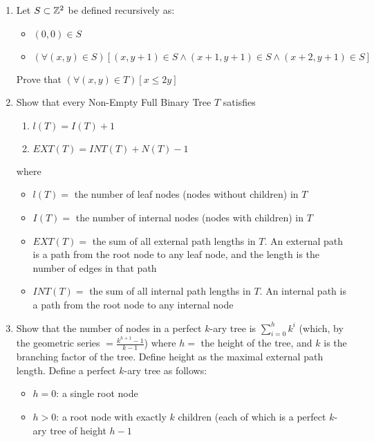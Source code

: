 \documentclass[main.tex]{subfiles}
\begin{document}
\begin{enumerate}
	\item Let \(S \subset \mathbb{Z}^2\) be defined recursively as:
	\begin{itemize}
		\item\((0,0) \in S\)
		\item \((\forall (x,y) \in S)[(x,y+1) \in S \land (x+1,y+1) \in S \land (x+2,y+1) \in S]\)
	\end{itemize}
	Prove that \((\forall (x,y) \in T)[x \leq 2y]\)
	\item Show that every Non-Empty Full Binary Tree \(T\) satisfies
	\begin{enumerate}
		\item \(l(T) = I(T) + 1\)
		\item \(EXT(T) = INT(T) + N(T) - 1\)
	\end{enumerate}
	where
	\begin{itemize}
		\item \(l(T) = \) the number of leaf nodes (nodes without children) in \(T\)
		\item \(I(T) = \) the number of internal nodes (nodes with children) in \(T\)
		\item \(EXT(T) = \) the sum of all external path lengths in \(T\). An external path is a path from the root node to any leaf node, and the length is the number of edges in that path
		\item \(INT(T) = \) the sum of all internal path lengths in \(T\). An internal path is a path from the root node to any internal node
	\end{itemize}
	\item Show that the number of nodes in a perfect \(k\)-ary tree is \(\sum_{i=0}^{h} k^i\) (which, by the geometric series \(= \frac{k^{h+1}-1}{k-1}\)) where \(h =\) the height of the tree, and \(k\) is the branching factor of the tree. Define height as the maximal external path length. Define a perfect \(k\)-ary tree as follows:
	\begin{itemize}
		\item \(h = 0\): a single root node
		\item \(h > 0\): a root node with exactly \(k\) children (each of which is a perfect \(k\)-ary tree of height \(h-1\)
	\end{itemize}
	

\end{enumerate}
\end{document}
